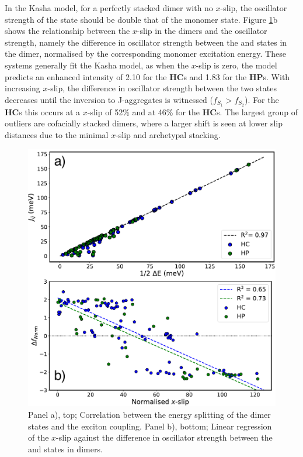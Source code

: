 In the Kasha model, for a perfectly stacked dimer with no $x$-slip, the oscillator strength of the \stwo{} state should be double that of the monomer state. Figure \ref{figure: dimer_regressions}b shows the relationship between the $x$-slip in the dimers and the oscillator strength, namely the difference in oscillator strength between the \stwo{} and \sone{} states in the dimer, normalised by the corresponding monomer excitation energy. These systems generally fit the Kasha model, as when the $x$-slip is zero, the model predicts an enhanced \stwo{} intensity of 2.10 for the \textbf{HC}s and 1.83 for the \textbf{HP}s. With increasing $x$-slip, the difference in oscillator strength between the two states decreases until the inversion to J-aggregates is witnessed ($f_{S_{1}}>f_{S_{2}}$). For the \textbf{HC}s this occurs at a $x$-slip of 52\% and at 46\% for the \textbf{HC}s. The largest group of outliers are cofacially stacked dimers, where a larger shift is seen at lower slip distances due to the minimal $x$-slip and archetypal stacking.\cite{Gierschner2016} 
\begin{figure}[t]
\centering
  \includegraphics[width=0.8\linewidth]{5ConnectingCrystalStructure/dimer_regressions.pdf}
  \caption[Correlation between the energy splitting and exciton coupling]{Panel a), top; Correlation between the energy splitting of the dimer states and the exciton coupling. Panel b), bottom; Linear regression of the $x$-slip against the difference in oscillator strength between the \stwo{} and \sone{} states in dimers.}
  \label{figure: dimer_regressions}
\end{figure}



